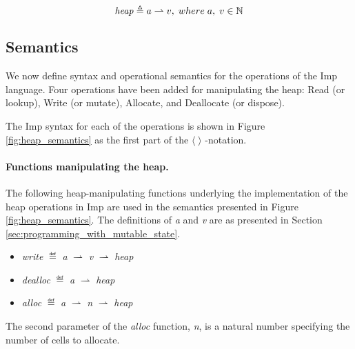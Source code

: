 \[
\mathit{heap} \mathrel{\triangleq} a\rightharpoonup v, \; where\; a, \;v \in \mathbb{N}
\] 

\subsection{Semantics}
\label{sec:semantics}
We now define syntax and operational semantics for the operations of the Imp language. Four operations have been added for manipulating the heap: Read (or lookup), Write (or mutate), Allocate, and Deallocate (or dispose).

The Imp syntax for each of the operations is shown in Figure \ref{fig:heap_semantics} as the first part of the $\langle \; \rangle$  -notation. 
\paragraph{Functions manipulating the heap.}
The following heap-manipulating functions underlying the implementation of the heap operations in Imp are used in the semantics presented in Figure \ref{fig:heap_semantics}. The definitions of {\it a} and {\it v} are as presented in Section \ref{sec:programming_with_mutable_state}.
\begin{itemize}
\item {\it write} $\eqdef$ {\it a} $\rightharpoonup$ {\it v} $\rightharpoonup$ {\it heap}
\item {\it dealloc} $\eqdef$ {\it a} $\rightharpoonup$ {\it heap}
\item {\it alloc} $\eqdef$ {\it a} $\rightharpoonup$ {\it n} $\rightharpoonup$ {\it heap}
\end{itemize}
The second parameter of the {\it alloc} function, {\it n}, is a natural number specifying the number of cells to allocate.

